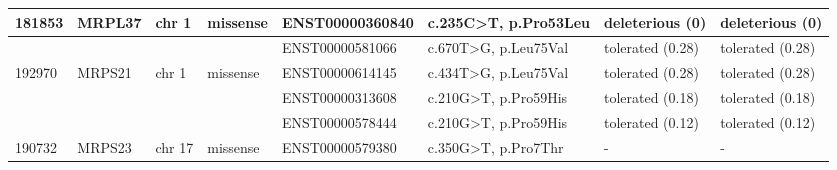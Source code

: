 \begin{landscape}
\begin{table}[]
{\begin{tabular}{|l|l|l|l|l|l|l|l|}
\multirow{-2}{*}{{\color[HTML]{000000} 181853}} & \multirow{-2}{*}{{\color[HTML]{000000} MRPL37}} & \multirow{-2}{*}{{\color[HTML]{000000} chr 1}}  & \multirow{-2}{*}{{\color[HTML]{000000} missense}} & {\color[HTML]{000000} ENST00000360840}     & {\color[HTML]{000000} c.235C\textgreater{}T, p.Pro53Leu}   & {\color[HTML]{000000} deleterious (0)}                   & deleterious (0)                   \\ \hline
{\color[HTML]{000000} }                         & {\color[HTML]{000000} }                         & {\color[HTML]{000000} }                         & {\color[HTML]{000000} }                           & {\color[HTML]{000000} ENST00000581066}     & {\color[HTML]{000000} c.670T\textgreater{}G, p.Leu75Val}   & {\color[HTML]{000000} tolerated (0.28)}                  & tolerated (0.28)                  \\ \cline{5-8} 
\multirow{-2}{*}{{\color[HTML]{000000} 192970}} & \multirow{-2}{*}{{\color[HTML]{000000} MRPS21}} & \multirow{-2}{*}{{\color[HTML]{000000} chr 1}}  & \multirow{-2}{*}{{\color[HTML]{000000} missense}} & {\color[HTML]{000000} ENST00000614145}     & {\color[HTML]{000000} c.434T\textgreater{}G, p.Leu75Val}   & {\color[HTML]{000000} tolerated (0.28)}                  & tolerated (0.28)                  \\ \hline
{\color[HTML]{000000} }                         & {\color[HTML]{000000} }                         & {\color[HTML]{000000} }                         & {\color[HTML]{000000} }                           & {\color[HTML]{000000} ENST00000313608}     & {\color[HTML]{000000} c.210G\textgreater{}T, p.Pro59His}   & {\color[HTML]{000000} tolerated (0.18)}                  & tolerated (0.18)                  \\ \cline{5-8} 
{\color[HTML]{000000} }                         & {\color[HTML]{000000} }                         & {\color[HTML]{000000} }                         & {\color[HTML]{000000} }                           & {\color[HTML]{000000} ENST00000578444}     & {\color[HTML]{000000} c.210G\textgreater{}T, p.Pro59His}   & {\color[HTML]{000000} tolerated (0.12)}                  & tolerated (0.12)                  \\ \cline{5-8} 
\multirow{-3}{*}{{\color[HTML]{000000} 190732}} & \multirow{-3}{*}{{\color[HTML]{000000} MRPS23}} & \multirow{-3}{*}{{\color[HTML]{000000} chr 17}} & \multirow{-3}{*}{{\color[HTML]{000000} missense}} & {\color[HTML]{000000} ENST00000579380}     & {\color[HTML]{000000} c.350G\textgreater{}T, p.Pro7Thr}    & {\color[HTML]{000000} -}                                 & -                                 \\ \hline

\end{tabular}}
\end{table}
\end{landscape}
